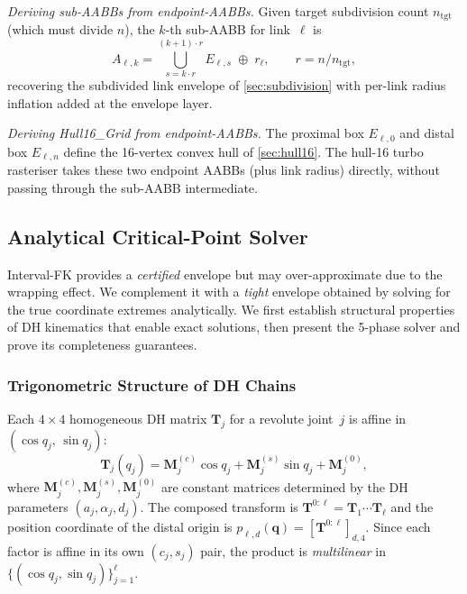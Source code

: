\documentclass[journal]{IEEEtran}
\newcommand{\bT}{\mathbf{T}}
\begin{document}
\emph{Deriving sub-AABBs from endpoint-AABBs.}
Given target subdivision count $n_\text{tgt}$ (which must divide $n$),
the $k$-th sub-AABB for link~$\ell$ is
\begin{equation}
  A_{\ell,k} = \bigcup_{s = k\cdot r}^{(k+1)\cdot r}\!E_{\ell,s}
  \;\oplus\; r_\ell,
  \qquad r = n / n_\text{tgt},
\end{equation}
recovering the subdivided link envelope of \cref{sec:subdivision}
with per-link radius inflation added at the envelope layer.

\emph{Deriving Hull16\_Grid from endpoint-AABBs.}
The proximal box $E_{\ell,0}$ and distal box $E_{\ell,n}$
define the 16-vertex convex hull of \cref{sec:hull16}.
The hull-16 turbo rasteriser takes these two endpoint AABBs
(plus link radius) directly, without passing through the
sub-AABB intermediate.

\subsection{Analytical Critical-Point Solver}\label{sec:critical}

Interval-FK provides a \emph{certified} envelope but may over-approximate
due to the wrapping effect.
We complement it with a \emph{tight} envelope obtained by solving for
the true coordinate extremes analytically.
We first establish structural properties of DH kinematics that
enable exact solutions, then present the 5-phase solver and prove
its completeness guarantees.


\subsubsection{Trigonometric Structure of DH Chains}\label{sec:critical_structure}

Each $4{\times}4$ homogeneous DH matrix $\bT_j$ for a revolute joint~$j$
is affine in $(\cos q_j,\,\sin q_j)$:
\begin{equation}\label{eq:dh_affine}
  \bT_j(q_j)
  = \bm{M}_j^{(c)}\cos q_j
  + \bm{M}_j^{(s)}\sin q_j
  + \bm{M}_j^{(0)},
\end{equation}
where $\bm{M}_j^{(c)}, \bm{M}_j^{(s)}, \bm{M}_j^{(0)}$ are constant
matrices determined by the DH parameters $(a_j,\alpha_j,d_j)$.
The composed transform is
$\bT^{0:\ell} = \bT_1 \cdots \bT_\ell$
and the position coordinate of the distal origin is
$p_{\ell,d}(\bm{q}) = [\bT^{0:\ell}]_{d,4}$.
Since each factor is affine in its own $(c_j,s_j)$ pair,
the product is \emph{multilinear} in
$\{(\cos q_j,\sin q_j)\}_{j=1}^\ell$.
\end{document}
